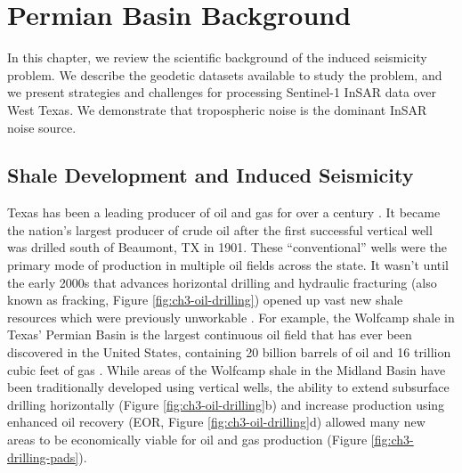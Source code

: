 
\chapter{Permian Basin Background}
\label{CHAP:3}



In this chapter, we review the scientific background of the induced seismicity problem.
We describe the geodetic datasets available to study the problem, and we present strategies and challenges for processing Sentinel-1 InSAR data over West Texas. We demonstrate that tropospheric noise is the dominant InSAR noise source.


\section{Shale Development and Induced Seismicity}
\label{sec:ch3-oil}

Texas has been a leading producer of oil and gas for over a century \citep{Frohlich2016HistoricalReviewInduced, TheAcademyofMedicine2017EnvironmentalCommunityImpacts}. It became the nation's largest producer of crude oil after the first successful vertical well was drilled south of Beaumont, TX in 1901. These ``conventional'' wells were the primary mode of production in multiple oil fields across the state. It wasn't until the early 2000s that advances horizontal drilling and hydraulic fracturing (also known as fracking, Figure \ref{fig:ch3-oil-drilling}) opened up vast new shale resources which were previously unworkable \citep{Waters2006Spe103202Ms}. 
For example, the Wolfcamp shale in Texas' Permian Basin is the largest continuous oil field that has ever been discovered in the United States, containing 20 billion barrels of oil and 16 trillion cubic feet of gas \citep{Gaswirth2016AssessmentUndiscoveredContinuous}. While areas of the Wolfcamp shale in the Midland Basin have been traditionally developed using vertical wells, the ability to extend subsurface drilling horizontally (Figure \ref{fig:ch3-oil-drilling}b) and increase production using enhanced oil recovery (EOR, Figure \ref{fig:ch3-oil-drilling}d)
allowed many new areas to be economically viable for oil and gas production (Figure \ref{fig:ch3-drilling-pads}).




